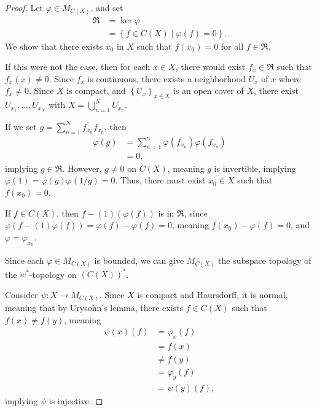 \documentclass[12pt]{extarticle}
\newcommand{\set}[1]{\left\{#1\right\}}
\theoremstyle{plain}
\theoremstyle{definition}
\theoremstyle{note}
\renewcommand{\newline}{\hfill\break}
\begin{document}
\begin{proof}
  Let $\varphi \in M_{C(X)}$, and set
  \begin{align*}
    \mathfrak{R} &= \ker\varphi\\
                 &= \set{f\in C(X) \mid \varphi(f) = 0}.
  \end{align*}
  We show that there exists $x_0$ in $X$ such that $f(x_0) = 0$ for all $f\in \mathfrak{R}$.\newline

  If this were not the case, then for each $x\in X$, there would exist $f_x\in \mathfrak{R}$ such that $f_x(x) \neq 0$. Since $f_x$ is continuous, there exists a neighborhood $U_x$ of $x$ where $f_x\neq 0$. Since $X$ is compact, and $\set{U_x}_{x\in X}$ is an open cover of $X$, there exist $U_{x_1},\dots,U_{x_N}$ with $X = \bigcup_{n=1}^{N}U_{x_n}$.\newline

  If we set $g = \sum_{n=1}^{N}\overline{f_{x_n}}f_{x_n}$, then
  \begin{align*}
    \varphi(g) &= \sum_{n=1}^{n}\varphi\left(\overline{f_{x_n}}\right)\varphi\left(f_{x_n}\right)\\
               &= 0,
  \end{align*}
  implying $g\in \mathfrak{R}$. However, $g\neq 0$ on $C(X)$, meaning $g$ is invertible, implying $\varphi(1) = \varphi(g) \varphi(1/g) = 0$. Thus, there must exist $x_0\in X$ such that $f(x_0) = 0$.\newline

  If $f\in C(X)$, then $f - (1)(\varphi(f))$ is in $\mathfrak{R}$, since $\varphi\left(f - (1)\varphi(f)\right) = \varphi(f) - \varphi(f) = 0$, meaning $f(x_0) - \varphi(f) = 0$, and $\varphi = \varphi_{x_0}$.\newline

  Since each $\varphi \in M_{C(X)}$ is bounded, we can give $M_{C(X)}$ the subspace topology of the $w^{\ast}$-topology on $\left(C(X)\right)^{\ast}$.\newline

  Consider $\psi: X \rightarrow M_{C(X)}$. Since $X$ is compact and Haursdorff, it is normal, meaning that by Urysohn's lemma, there exists $f\in C(X)$ such that $f(x) \neq f(y)$, meaning
  \begin{align*}
    \psi(x)(f) &= \varphi_x(f)\\
               &= f(x)\\
               &\neq f(y)\\
               &= \varphi_y(f)\\
               &= \psi(y)(f),
  \end{align*}
  implying $\psi$ is injective.\newline


\end{proof}
\end{document}
